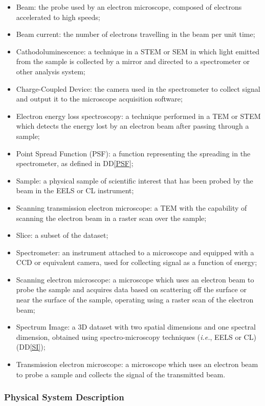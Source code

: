 \documentclass[12pt]{article}
\newcommand{\ddref}[1]{DD\ref{#1}}
\begin{document}
\begin{itemize}
	\item Beam: the probe used by an electron microscope, composed of electrons
accelerated to high speeds;
	\item Beam current: the number of electrons travelling in the beam per unit
time;
	\item Cathodoluminescence: a technique in a STEM or SEM in which light emitted
from the sample is collected by a mirror and directed to a spectrometer or other
analysis system;
	\item Charge-Coupled Device: the camera used in the spectrometer to collect
signal and output it to the microscope acquisition software;
	\item Electron energy loss spectroscopy: a technique performed in a TEM or STEM
which detects the energy lost by an electron beam after passing through a
sample;
	\item Point Spread Function (PSF): a function representing the spreading in the
spectrometer, as defined in \ddref{PSF};
	\item Sample: a physical sample of scientific interest that has been probed by
the beam in the EELS or CL instrument; 
	\item Scanning transmission electron microscope: a TEM with the capability of
scanning the electron beam in a raster scan over the sample;
	\item Slice: a subset of the dataset;
	\item Spectrometer: an instrument attached to a microscope and equipped with a
CCD or equivalent camera, used for collecting signal as a function of energy;
	\item Scanning electron microscope: a microscope which uses an electron beam to
probe the sample and acquires data based on scattering off the surface or near
the surface of the sample, operating using a raster scan of the electron beam;
	\item Spectrum Image: a 3D dataset with two spatial dimensions and one spectral
dimension, obtained using spectro-microscopy techniques (\textit{i.e.}, EELS or
CL) (\ddref{SI});
	\item Transmission electron microscope: a microscope which uses an electron
beam to probe a sample and collects the signal of the transmitted beam.
\end{itemize}

\subsubsection{Physical System Description}
\end{document}
